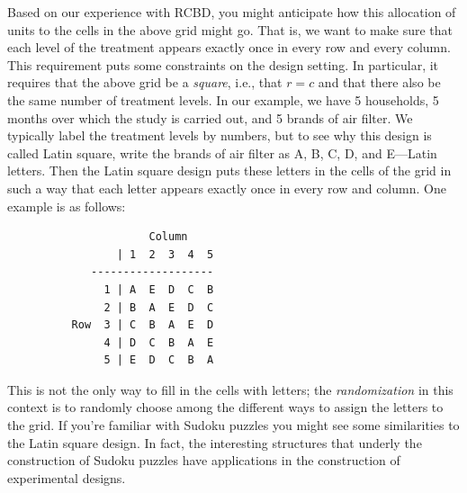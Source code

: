 \documentclass[a4paper, 12pt]{article}
\theoremstyle{plain}
\theoremstyle{definition}
\theoremstyle{remark}
\begin{document}
Based on our experience with RCBD, you might anticipate how this allocation of units to the cells in the above grid might go.  That is, we want to make sure that each level of the treatment appears exactly once in every row and every column.  This requirement puts some constraints on the design setting.  In particular, it requires that the above grid be a {\em square}, i.e., that $r=c$ and that there also be the same number of treatment levels.  In our example, we have 5 households, 5 months over which the study is carried out, and 5 brands of air filter.  We typically label the treatment levels by numbers, but to see why this design is called Latin square, write the brands of air filter as A, B, C, D, and E---Latin letters.  Then the Latin square design puts these letters in the cells of the grid in such a way that each letter appears exactly once in every row and column.  One example is as follows:
{\small
\begin{verbatim}
                      Column 
                 | 1  2  3  4  5
             -------------------
               1 | A  E  D  C  B
               2 | B  A  E  D  C
          Row  3 | C  B  A  E  D
               4 | D  C  B  A  E
               5 | E  D  C  B  A
\end{verbatim}
}
This is not the only way to fill in the cells with letters; the {\em randomization} in this context is to randomly choose among the different ways to assign the letters to the grid.  If you're familiar with Sudoku puzzles you might see some similarities to the Latin square design.  In fact, the interesting structures that underly the construction of Sudoku puzzles have applications in the construction of experimental designs.
\end{document}
